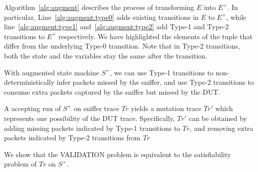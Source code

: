 Algorithm~\ref{alg:augment} describes the process of transforming $E$ into
$E^+$. In particular, Line~\ref{alg:augment:type0} adds existing transitions in
$E$ to $E^+$, while line~\ref{alg:augment:type1} and~\ref{alg:augment:type2} add
Type-1 and Type-2 transitions to $E^+$ respectively.  We have highlighted the
elements of the tuple that differ from the underlying Type-0 transition. Note
that in Type-2 transitions, both the state and the variables stay the same after
the transition.

With augmented state machine $S^+$, we can use Type-1 transitions to
non-deterministically infer packets missed by the sniffer, and use Type-2
transitions to consume extra packets captured by the sniffer but missed by the
DUT.

A accepting run of $S^+$ on sniffer trace $Tr$ yields a mutation trace $Tr'$
which represents one possibility of the DUT trace. Specifically, $Tr'$ can be
obtained by adding missing packets indicated by Type-1 transitions to $Tr$, and
removing extra packets indicated by Type-2 transitions from $Tr$

We show that the VALIDATION problem is equivalent to the
satisfiability problem of $Tr$ on $S^+$.

